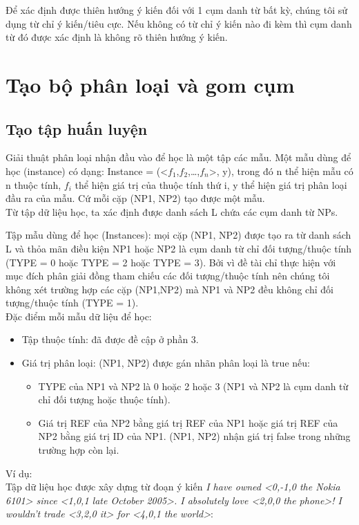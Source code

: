 \documentclass[12pt]{report}
\begin{document}
				\par Để xác định được thiên hướng ý kiến đối với 1 cụm danh từ bất kỳ, chúng tôi sử dụng từ chỉ ý kiến/tiêu cực. Nếu không có từ chỉ ý kiến nào đi kèm thì cụm danh từ đó được xác định là không rõ thiên hướng ý kiến.

		\section{Tạo bộ phân loại và gom cụm}
			\subsection*{Tạo tập huấn luyện}
				\par Giải thuật phân loại nhận đầu vào để học là một tập các mẫu. Một mẫu dùng để học (instance) có dạng: Instance = (<$f_1$,$f_2$,…,$f_n$>, y), trong đó n thể hiện mẫu có n thuộc tính, $f_i$ thể hiện giá trị của thuộc tính thứ i, y thể hiện giá trị phân loại đầu ra của mẫu. Cứ mỗi cặp (NP1, NP2) tạo được một mẫu. 
				\\Từ tập dữ liệu học, ta xác định được danh sách L chứa các cụm danh từ NPs.
				\par Tập mẫu dùng để học (Instances): mọi cặp (NP1, NP2) được tạo ra từ danh sách L và thỏa mãn điều kiện NP1 hoặc NP2 là cụm danh từ chỉ đối tượng/thuộc tính (TYPE = 0 hoặc TYPE = 2 hoặc TYPE = 3). Bởi vì đề tài chỉ thực hiện với mục đích phân giải đồng tham chiếu các đối tượng/thuộc tính nên chúng tôi không xét trường hợp các cặp (NP1,NP2) mà NP1 và NP2 đều không chỉ đối tượng/thuộc tính (TYPE = 1).
				\\Đặc điểm mỗi mẫu dữ liệu để học:
				\begin{itemize}
					\item{Tập thuộc tính: đã được đề cập ở phần 3.}
					\item{Giá trị phân loại: (NP1, NP2) được gán nhãn phân loại là true nếu:
						\begin{itemize}
							\item{TYPE của NP1 và NP2 là 0 hoặc 2 hoặc 3 (NP1 và NP2 là cụm danh từ chỉ đối tượng hoặc thuộc tính).}
							\item{Giá trị REF của NP2 bằng giá trị REF của NP1 hoặc giá trị REF của NP2 bằng giá trị ID của NP1. (NP1, NP2) nhận giá trị false trong những trường hợp còn lại.}
						\end{itemize}}
				\end{itemize}
				\par Ví dụ: 
				\\Tập dữ liệu học được xây dựng từ đoạn ý kiến \textit{I have owned <0,-1,0 the Nokia 6101> since <1,0,1 late October 2005>. I absolutely love <2,0,0 the phone>! I wouldn't trade <3,2,0 it> for <4,0,1 the world>}:
\end{document}
